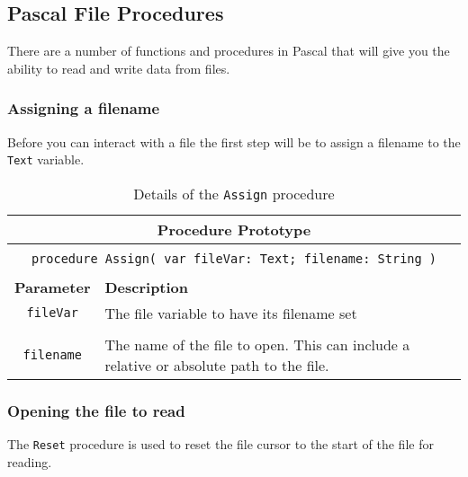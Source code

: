 \clearpage
\subsection{Pascal File Procedures} %
\label{sub:pas_file_functions}

There are a number of functions and procedures in Pascal that will give you the ability to read and write data from files.

\subsubsection{Assigning a filename} %
\label{ssub:assigning_a_filename}

Before you can interact with a file the first step will be to assign a filename to the \texttt{Text} variable.

\begin{table}[h]
  \centering
  \begin{tabular}{|c|p{9.5cm}|}
    \hline
    \multicolumn{2}{|c|}{\textbf{Procedure Prototype}} \\
    \hline
    \multicolumn{2}{|c|}{} \\
    \multicolumn{2}{|c|}{\texttt{procedure Assign( var fileVar: Text; filename: String )}} \\
    \multicolumn{2}{|c|}{} \\
    \hline
    \textbf{Parameter} & \textbf{Description} \\
    \hline
    \texttt{ fileVar } & The file variable to have its filename set\\
    & \\
    \texttt{ filename } & The name of the file to open. This can include a relative or absolute path to the file. \\
    \hline
  \end{tabular}
  \caption{Details of the \texttt{Assign} procedure}
  \label{tbl:assign}
\end{table}


\subsubsection{Opening the file to read} %
\label{ssub:opening_the_file_to_read}

The \texttt{Reset} procedure is used to reset the file cursor to the start of the file for reading.

